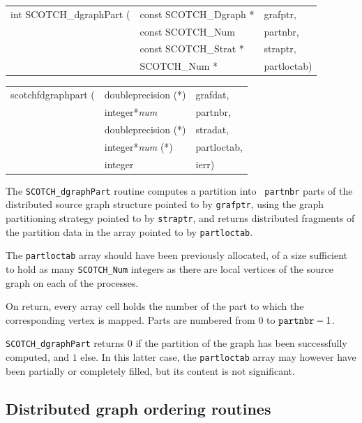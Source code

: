 \begin{itemize}
\progsyn

{\tt\begin{tabular}{l@{}ll}
int SCOTCH\_dgraphPart ( & const SCOTCH\_Dgraph * & grafptr, \\
                         & const SCOTCH\_Num      & partnbr, \\
                         & const SCOTCH\_Strat *  & straptr, \\
                         & SCOTCH\_Num *          & partloctab)
\end{tabular}}

{\tt\begin{tabular}{l@{}ll}
scotchfdgraphpart ( & doubleprecision (*)   & grafdat,    \\
                    & integer*{\it num}     & partnbr,    \\
                    & doubleprecision (*)   & stradat,    \\
                    & integer*{\it num} (*) & partloctab, \\
                    & integer               & ierr)
\end{tabular}}

\progdes

The {\tt SCOTCH\_dgraphPart} routine computes a partition into {\tt
partnbr} parts of the distributed source graph structure pointed to
by {\tt grafptr}, using the graph partitioning strategy pointed to by
{\tt straptr}, and returns distributed fragments of the partition
data in the array pointed to by {\tt partloctab}.

The {\tt partloctab} array should have been previously allocated, of a
size sufficient to hold as many {\tt SCOTCH\_\lbt Num} integers as
there are local vertices of the source graph on each of the processes.

On return, every array cell holds the number of the part to which the
corresponding vertex is mapped. Parts are numbered from $0$ to
$\mbox{\tt partnbr} - 1$.

\progret

{\tt SCOTCH\_dgraphPart} returns $0$ if the partition of the graph has
been successfully computed, and $1$ else. In this latter case, the
{\tt partloctab} array may however have been partially or completely
filled, but its content is not significant.
\end{itemize}

\subsection{Distributed graph ordering routines}

